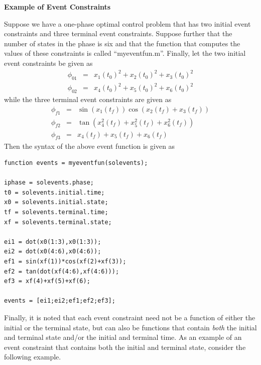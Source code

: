 \documentclass[10pt]{article}
\newenvironment{shadedframe}{%
  \def\FrameCommand{\fcolorbox{black}{shadecolor}}%
  \MakeFramed {\FrameRestore}}
{\endMakeFramed}
\begin{document}
\scriptsize
\begin{shadedframe}
{\noindent}{\bf Example of Event Constraints}
\vspace{12pt}

{\noindent}Suppose we have a one-phase optimal control problem that has two
initial event constraints and three terminal event constraints.  Suppose
further that the number of states in the phase is six and that the function
that computes the values of these constraints is called ``myeventfun.m''.
Finally, let the two initial event constraints be given as
\begin{displaymath}
  \begin{array}{lcl}
    \phi_{01} & = & x_1(t_0)^2+x_2(t_0)^2+x_3(t_0)^2 \\
    \phi_{02} & = & x_4(t_0)^2+x_5(t_0)^2+x_6(t_0)^2
  \end{array}
\end{displaymath}
while the three terminal event constraints are given as
\begin{displaymath}
  \begin{array}{lcl}
    \phi_{f1} & = & \sin(x_1(t_f))\cos(x_2(t_f)+x_3(t_f)) \\
    \phi_{f2} & = & \tan(x_4^2(t_f)+x_5^2(t_f)+x_6^2(t_f)) \\
    \phi_{f3} & = & x_4(t_f)+x_5(t_f)+x_6(t_f)
  \end{array}
\end{displaymath}
Then the syntax of the above event function is given as
\begin{verbatim}
function events = myeventfun(solevents);

iphase = solevents.phase;
t0 = solevents.initial.time;
x0 = solevents.initial.state;
tf = solevents.terminal.time;
xf = solevents.terminal.state;

ei1 = dot(x0(1:3),x0(1:3));
ei2 = dot(x0(4:6),x0(4:6));
ef1 = sin(xf(1))*cos(xf(2)+xf(3));
ef2 = tan(dot(xf(4:6),xf(4:6)));
ef3 = xf(4)+xf(5)+xf(6);

events = [ei1;ei2;ef1;ef2;ef3];
\end{verbatim}
\end{shadedframe}
\normalsize

Finally, it is noted that each event constraint need not be a function of
either the initial or the terminal state, but can also be functions that
contain {\em both} the initial and terminal state and/or the initial and
terminal time.  As an example of an event constraint that contains both the
initial and terminal state, consider the following example.
\end{document}
